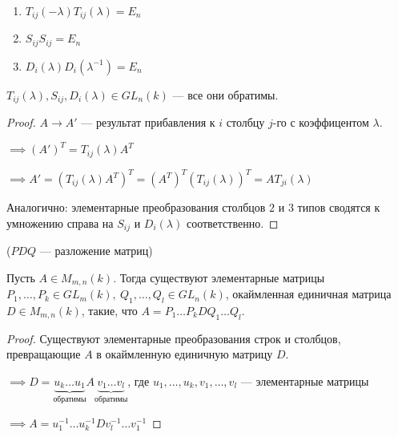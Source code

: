 \begin{follow}~

    \begin{enumerate}
        \item $T_{ij}(-\lambda) T_{ij}(\lambda) = E_n$
        
        \item $S_{ij} S_{ij} = E_n$
        
        \item $D_i(\lambda) D_i(\lambda^{-1}) = E_n$
    \end{enumerate}
\end{follow}

\begin{follow}
    $T_{ij}(\lambda), S_{ij}, D_i(\lambda) \in GL_n(k)$ --- все они обратимы.
\end{follow}

\begin{proof}
    
    $A \longrightarrow A'$ --- результат прибавления к $i$ столбцу $j$-го с коэффицентом $\lambda$.

    $\implies (A')^T = T_{ij}(\lambda) A^T$

    $\implies A' = (T_{ij}(\lambda) A^T)^T = (A^T)^T (T_{ij}(\lambda))^T = A T_{ji}(\lambda)$

    Аналогично: элементарные преобразования столбцов $2$ и $3$ типов сводятся к умножению справа на $S_{ij}$ и $D_i(\lambda)$ соответственно.
\end{proof}

\begin{theorem-non} ($PDQ$ --- разложение матриц)

    Пусть $A \in M_{m,n}(k)$. Тогда существуют элементарные матрицы $P_1, \ldots, P_k \in GL_m(k),~Q_1, \ldots, Q_l \in GL_n(k)$, окаймленная единичная матрица $D \in M_{m, n}(k)$, такие, что $A = P_1 \ldots P_k D Q_1 \ldots Q_l$.
\end{theorem-non}

\begin{proof}
    Существуют элементарные преобразования строк и столбцов, превращающие $A$ в окаймленную единичную матрицу $D$.

    $\implies D = \underbrace{u_k \ldots u_1}_{\text{обратимы}} A \underbrace{v_1 \ldots v_l}_{\text{обратимы}}$, где $u_1, \ldots, u_k, v_1, \ldots, v_l$ --- элементарные матрицы

    $\implies A = u_1^{-1} \ldots u_k^{-1} D v_l^{-1} \ldots v_1^{-1}$
\end{proof}

